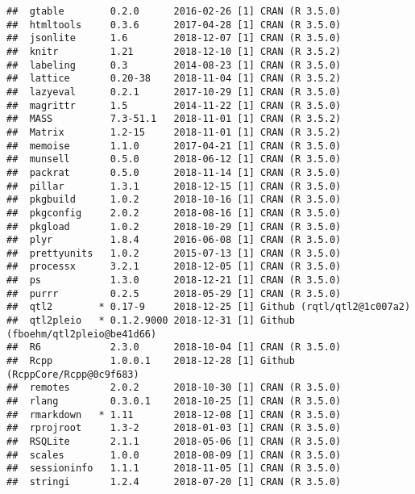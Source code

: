\documentclass{book}
\begin{document}
\begin{verbatim}
##  gtable        0.2.0      2016-02-26 [1] CRAN (R 3.5.0)                   
##  htmltools     0.3.6      2017-04-28 [1] CRAN (R 3.5.0)                   
##  jsonlite      1.6        2018-12-07 [1] CRAN (R 3.5.0)                   
##  knitr         1.21       2018-12-10 [1] CRAN (R 3.5.2)                   
##  labeling      0.3        2014-08-23 [1] CRAN (R 3.5.0)                   
##  lattice       0.20-38    2018-11-04 [1] CRAN (R 3.5.2)                   
##  lazyeval      0.2.1      2017-10-29 [1] CRAN (R 3.5.0)                   
##  magrittr      1.5        2014-11-22 [1] CRAN (R 3.5.0)                   
##  MASS          7.3-51.1   2018-11-01 [1] CRAN (R 3.5.2)                   
##  Matrix        1.2-15     2018-11-01 [1] CRAN (R 3.5.2)                   
##  memoise       1.1.0      2017-04-21 [1] CRAN (R 3.5.0)                   
##  munsell       0.5.0      2018-06-12 [1] CRAN (R 3.5.0)                   
##  packrat       0.5.0      2018-11-14 [1] CRAN (R 3.5.0)                   
##  pillar        1.3.1      2018-12-15 [1] CRAN (R 3.5.0)                   
##  pkgbuild      1.0.2      2018-10-16 [1] CRAN (R 3.5.0)                   
##  pkgconfig     2.0.2      2018-08-16 [1] CRAN (R 3.5.0)                   
##  pkgload       1.0.2      2018-10-29 [1] CRAN (R 3.5.0)                   
##  plyr          1.8.4      2016-06-08 [1] CRAN (R 3.5.0)                   
##  prettyunits   1.0.2      2015-07-13 [1] CRAN (R 3.5.0)                   
##  processx      3.2.1      2018-12-05 [1] CRAN (R 3.5.0)                   
##  ps            1.3.0      2018-12-21 [1] CRAN (R 3.5.0)                   
##  purrr         0.2.5      2018-05-29 [1] CRAN (R 3.5.0)                   
##  qtl2        * 0.17-9     2018-12-25 [1] Github (rqtl/qtl2@1c007a2)       
##  qtl2pleio   * 0.1.2.9000 2018-12-31 [1] Github (fboehm/qtl2pleio@be41d66)
##  R6            2.3.0      2018-10-04 [1] CRAN (R 3.5.0)                   
##  Rcpp          1.0.0.1    2018-12-28 [1] Github (RcppCore/Rcpp@0c9f683)   
##  remotes       2.0.2      2018-10-30 [1] CRAN (R 3.5.0)                   
##  rlang         0.3.0.1    2018-10-25 [1] CRAN (R 3.5.0)                   
##  rmarkdown   * 1.11       2018-12-08 [1] CRAN (R 3.5.0)                   
##  rprojroot     1.3-2      2018-01-03 [1] CRAN (R 3.5.0)                   
##  RSQLite       2.1.1      2018-05-06 [1] CRAN (R 3.5.0)                   
##  scales        1.0.0      2018-08-09 [1] CRAN (R 3.5.0)                   
##  sessioninfo   1.1.1      2018-11-05 [1] CRAN (R 3.5.0)                   
##  stringi       1.2.4      2018-07-20 [1] CRAN (R 3.5.0)                   

\end{verbatim}
\end{document}
